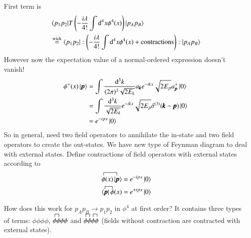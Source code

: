 First term is 
\begin{align*}
	&\braket{p_1 p_2 | T \left( -\frac{i\lambda}{4!} \int \dd^4 x \phi^4(x) \right)|p_A p_B } \\
	&\stackrel{\text{wick}}{=} \braket{p_1 p_2 | :\left( -\frac{i\lambda}{4!} \int \dd^4 x \phi^4(x) + \text{contractions}\right ):|p_A p_B }
\end{align*}
However now the expectation value of a normal-ordered expression doesn't vanish!
\begin{align*}
	\phi^+(x) \ket{\pmb{p}} &= \int \frac{\dd^3 k}{(2\pi)^3 \sqrt{2E_k}} a_{\pmb{k}} e^{-ikx}\sqrt{2E_p} a^+_{\pmb{p}} \ket{0}\\
							&= \int \frac{\dd^3 k}{\sqrt{2E_k}} e^{-ikx}\sqrt{2E_p} \delta^{(3)}(\pmb{k}-\pmb{p}) \ket{0}\\
							&= e^{-ipx} \ket{0}
\end{align*}
So in general, need two field operators to annihilate the in-state and two field operators to create the out-states. We have new type of Feynman diagram to deal with external states. Define contractions of field operators with external states according to 
\begin{align*}
	\contraction{}{\phi}{(x)|}{\pmb{p}} \phi(x) \ket{\pmb{p}} &= e^{-ipx}\ket{0} \\
	\contraction{\langle}{\pmb{p}}{|\;}{\phi} \bra{\pmb{p}}\phi(x)  &= e^{+ipx}\ket{0} 
\end{align*}

How does this work for $p_A p_B \rightarrow p_1 p_2$ in $\phi^4$ at first order? It contains three types of terms: $\phi\phi\phi\phi$, $\contraction{}{\phi}{}{\phi}\phi\phi\phi\phi$ and $\contraction{}{\phi}{}{\phi}\phi\phi \contraction{}{\phi}{}{\phi}\phi\phi$ (fields without contraction are contracted with external states).

